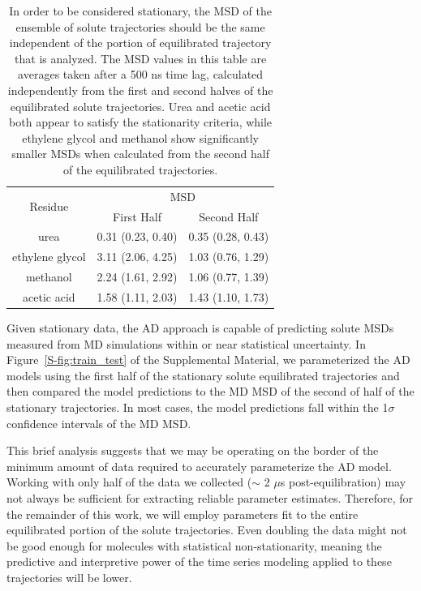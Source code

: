 \documentclass[aps,pre,preprint,groupedaddress,longbibliography]{revtex4-2}
\begin{document}
  \begin{table}[h]
  \centering
  \begin{tabular}{|c|c|c|}
  \hline
  \multirow{2}{*}{Residue} & \multicolumn{2}{c|}{MSD}            \\\cline{2-3}
                           & First Half       & Second Half      \\\hline
  urea                     & 0.31 (0.23, 0.40)& 0.35 (0.28, 0.43)\\\hline
  ethylene glycol          & 3.11 (2.06, 4.25)& 1.03 (0.76, 1.29)\\\hline
  methanol                 & 2.24 (1.61, 2.92)& 1.06 (0.77, 1.39)\\\hline
  acetic acid              & 1.58 (1.11, 2.03)& 1.43 (1.10, 1.73)\\\hline

  \end{tabular}
  \caption{In order to be considered stationary, the MSD of the ensemble of solute 
  trajectories should be the same independent of the portion of equilibrated 
  trajectory that is analyzed. The MSD values in this table are averages taken 
  after a 500 ns time lag, calculated independently from the first and second 
  halves of the equilibrated solute trajectories. Urea and acetic acid both 
  appear to satisfy the stationarity criteria, while ethylene glycol and methanol
  show significantly smaller MSDs when calculated from the second half of the 
  equilibrated trajectories.}\label{table:stationarity}
  \end{table}

  Given stationary data, the AD approach is capable of predicting solute MSDs 
  measured from MD simulations within or near statistical uncertainty.
  In Figure~\ref{S-fig:train_test} of the Supplemental Material, we parameterized 
  the AD models using the first half of the stationary solute equilibrated trajectories 
  and then compared the model predictions to the MD MSD of the second of half 
  of the stationary trajectories. In most cases, the model predictions fall within
  the 1$\sigma$ confidence intervals of the MD MSD.
  
  This brief analysis suggests that we may be operating on the border of the minimum 
  amount of data required to accurately parameterize the AD model. Working with 
  only half of the data we collected ($\sim$ 2 $\mu$s post-equilibration) may not
  always be sufficient for extracting reliable parameter estimates. Therefore, for 
  the remainder of this work, we will employ parameters fit to the entire
  equilibrated portion of the solute trajectories. Even doubling the data might 
  not be good enough for molecules with statistical non-stationarity, meaning the
  predictive and interpretive power of the time series modeling applied to these 
  trajectories will be lower.
\end{document}
